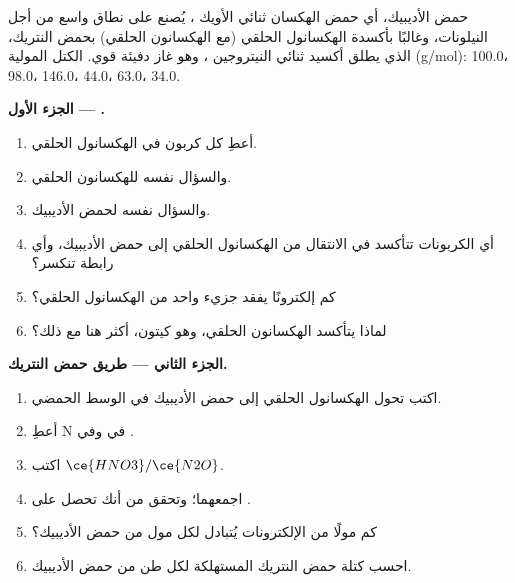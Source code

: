 \begin{problem}
\label{pb:b1:organic-redox:1}
حمض الأديبيك، أي حمض الهكسان ثنائي الأويك ، يُصنع على نطاق واسع
من أجل النيلونات، وغالبًا بأكسدة الهكسانول الحلقي (مع الهكسانون الحلقي)
بحمض النتريك، الذي يطلق أكسيد ثنائي النيتروجين ، وهو غاز دفيئة
قوي. الكتل المولية (\unit{g/mol}):  100.0،
 98.0،  146.0،  44.0،  63.0،
 34.0.

\medskip
\noindent\textbf{الجزء الأول --- .}
\begin{enumerate}
  \item أعطِ  كل كربون في الهكسانول الحلقي.
  \item والسؤال نفسه للهكسانون الحلقي.
  \item والسؤال نفسه لحمض الأديبيك.
  \item أي الكربونات تتأكسد في الانتقال من الهكسانول الحلقي إلى حمض
        الأديبيك، وأي رابطة تنكسر؟
  \item كم إلكترونًا يفقد جزيء واحد من الهكسانول الحلقي؟
  \item لماذا يتأكسد الهكسانون الحلقي، وهو كيتون، أكثر هنا مع ذلك؟
\end{enumerate}

\medskip
\noindent\textbf{الجزء الثاني --- طريق حمض النتريك.}
\begin{enumerate}[resume]
  \item اكتب  تحول الهكسانول الحلقي إلى حمض الأديبيك في الوسط الحمضي.
  \item أعطِ  N في  وفي .
  \item اكتب  $\ce{HNO3}/\ce{N2O}$.
  \item اجمعهما؛ وتحقق من أنك تحصل على
        .
  \item كم مولًا من الإلكترونات يُتبادل لكل مول من حمض
        الأديبيك؟
  \item احسب كتلة حمض النتريك المستهلكة لكل طن من حمض الأديبيك.
\end{enumerate}


\end{problem}
